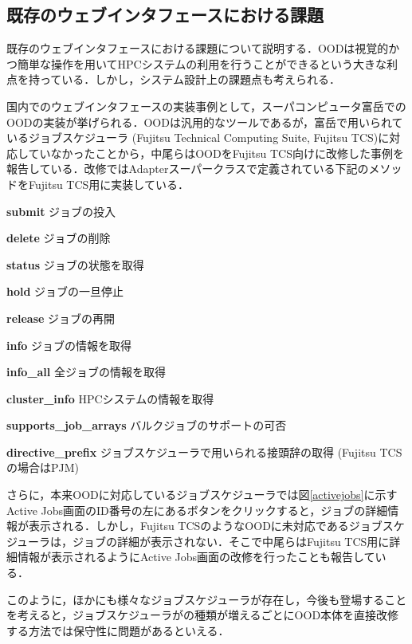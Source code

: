 \subsection{既存のウェブインタフェースにおける課題}
既存のウェブインタフェースにおける課題について説明する．OODは視覚的かつ簡単な操作を用いてHPCシステムの利用を行うことができるという大きな利点を持っている．しかし，システム設計上の課題点も考えられる．\par
国内でのウェブインタフェースの実装事例として，スーパコンピュータ富岳でのOODの実装が挙げられる．OODは汎用的なツールであるが，富岳で用いられているジョブスケジューラ (Fujitsu Technical Computing Suite, Fujitsu TCS)に対応していなかったことから，中尾らはOODをFujitsu TCS向けに改修した事例を報告している\cite{cite4}．改修ではAdapterスーパークラスで定義されている下記のメソッドをFujitsu TCS用に実装している．\par

\textbf{submit} ジョブの投入\par
\textbf{delete} ジョブの削除\par
\textbf{status} ジョブの状態を取得\par
\textbf{hold} ジョブの一旦停止\par
\textbf{release} ジョブの再開\par
\textbf{info} ジョブの情報を取得\par
\textbf{info\_all} 全ジョブの情報を取得\par
\textbf{cluster\_info} HPCシステムの情報を取得\par
\textbf{supports\_job\_arrays} バルクジョブのサポートの可否\par
\textbf{directive\_prefix} ジョブスケジューラで用いられる接頭辞の取得 (Fujitsu TCSの場合はPJM)\par

さらに，本来OODに対応しているジョブスケジューラでは図\ref{activejobs}に示すActive Jobs画面のID番号の左にあるボタンをクリックすると，ジョブの詳細情報が表示される．しかし，Fujitsu TCSのようなOODに未対応であるジョブスケジューラは，ジョブの詳細が表示されない．そこで中尾らはFujitsu TCS用に詳細情報が表示されるようにActive Jobs画面の改修を行ったことも報告している\cite{cite4}．\par
このように，ほかにも様々なジョブスケジューラが存在し，今後も登場することを考えると，ジョブスケジューラがの種類が増えるごとにOOD本体を直接改修する方法では保守性に問題があるといえる．\par


